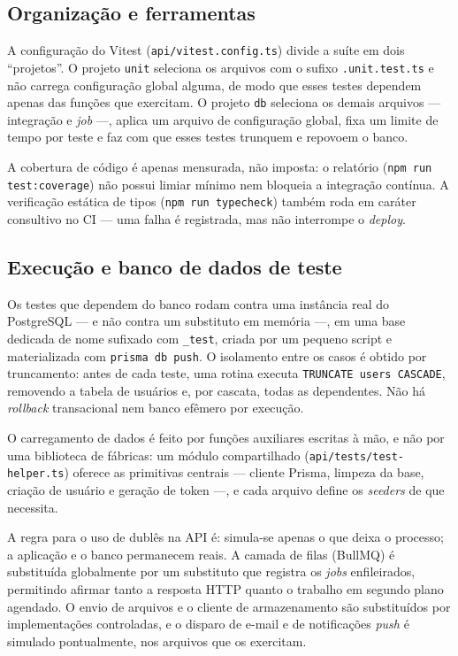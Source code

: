 \subsection{Organização e ferramentas}\label{sec:test-api-org}

A configuração do Vitest (\texttt{api/vitest.config.ts}) divide a suíte em dois
``projetos''. O projeto \texttt{unit} seleciona os arquivos com o sufixo
\texttt{.unit.test.ts} e não carrega configuração global alguma, de modo que
esses testes dependem apenas das funções que exercitam. O projeto \texttt{db}
seleciona os demais arquivos --- integração e \textit{job} ---, aplica um arquivo
de configuração global, fixa um limite de tempo por teste e faz com que esses
testes trunquem e repovoem o banco.

A cobertura de código é apenas mensurada, não imposta: o relatório
(\texttt{npm run test:coverage}) não possui limiar mínimo nem bloqueia a
integração contínua. A verificação estática de tipos (\texttt{npm run typecheck})
também roda em caráter consultivo no CI --- uma falha é registrada, mas não
interrompe o \textit{deploy}.

\subsection{Execução e banco de dados de teste}\label{sec:test-api-db}

Os testes que dependem do banco rodam contra uma instância real do PostgreSQL
--- e não contra um substituto em memória ---, em uma base dedicada de nome
sufixado com \texttt{\_test}, criada por um pequeno script e materializada com
\texttt{prisma db push}. O isolamento entre os casos é obtido por truncamento:
antes de cada teste, uma rotina executa \texttt{TRUNCATE users CASCADE},
removendo a tabela de usuários e, por cascata, todas as dependentes. Não há
\textit{rollback} transacional nem banco efêmero por execução.

O carregamento de dados é feito por funções auxiliares escritas à mão, e não por
uma biblioteca de fábricas: um módulo compartilhado
(\texttt{api/tests/test-helper.ts}) oferece as primitivas centrais --- cliente
Prisma, limpeza da base, criação de usuário e geração de token ---, e cada
arquivo define os \textit{seeders} de que necessita.

A regra para o uso de dublês na API é: simula-se apenas o que deixa o processo;
a aplicação e o banco permanecem reais. A camada de filas (BullMQ) é substituída
globalmente por um substituto que registra os \textit{jobs} enfileirados,
permitindo afirmar tanto a resposta HTTP quanto o trabalho em segundo plano
agendado. O envio de arquivos e o cliente de armazenamento são substituídos por
implementações controladas, e o disparo de e-mail e de notificações
\textit{push} é simulado pontualmente, nos arquivos que os exercitam.

